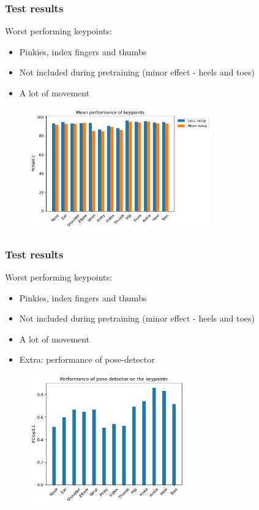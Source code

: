 \documentclass{beamer}
\begin{document}
\begin{frame}
    \frametitle{Test results}
    Worst performing keypoints:
    \begin{itemize}
        \item Pinkies, index fingers and thumbs
        \item Not included during pretraining (minor effect - heels and toes)
        \item A lot of movement
    \end{itemize}
    \begin{figure}
        \centering
        \includegraphics[width = 0.7\textwidth]{entities/kpts.pdf}
    \end{figure}
\end{frame}

\begin{frame}
    \frametitle{Test results}
    Worst performing keypoints:
    \begin{itemize}
        \item Pinkies, index fingers and thumbs
        \item Not included during pretraining (minor effect - heels and toes)
        \item A lot of movement
        \item Extra: performance of pose-detector
    \end{itemize}
    \begin{figure}
        \centering
        \includegraphics[width = 0.6\textwidth]{entities/kpts_pose_detector.pdf}
    \end{figure}
\end{frame}
\end{document}
